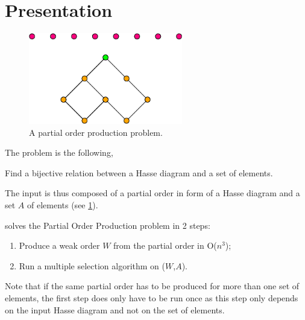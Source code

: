 \section{Presentation}
\label{tree:pop:presentation}

\begin{figure}
	\centering
	\includegraphics[width=0.6\textwidth]{fig/pop:diag}
	\caption{\label{fig:pop:diag} A partial order production problem.}
\end{figure}

The problem is the following,

Find a bijective relation between a Hasse diagram and a set of elements.

The input is thus composed of a partial order in form of a Hasse diagram and a set $A$ of elements (see \ref{fig:pop:diag}).

\cite{jcardin1} solves the Partial Order Production problem in 2 steps:

\begin{enumerate}
\item Produce a weak order $W$ from the partial order in O($n^3$);
\item Run a multiple selection algorithm on ($W$,$A$).
\end{enumerate}


Note that if the same partial order has to be produced for more than one set of elements, the first step does only have to be run once as this step only depends on the input Hasse diagram and not on the set of elements.